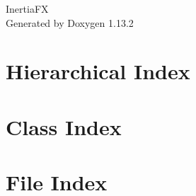 \documentclass[twoside]{book}
\newcommand{\+}{\discretionary{\mbox{\scriptsize$\hookleftarrow$}}{}{}}
\newcommand{\clearemptydoublepage}{%
    \newpage{\pagestyle{empty}\cleardoublepage}%
  }
\begin{document}
  \raggedbottom
    \hypersetup{pageanchor=false,
                bookmarksnumbered=true,
                pdfencoding=unicode
               }
  \begin{titlepage}
  \vspace*{7cm}
  \begin{center}%
  {\Large Inertia\+FX}\\
  \vspace*{1cm}
  {\large Generated by Doxygen 1.13.2}\\
  \end{center}
  \end{titlepage}
  \clearemptydoublepage
  \tableofcontents
  \clearemptydoublepage
  \hypersetup{pageanchor=true}
\chapter{Hierarchical Index}

\chapter{Class Index}

\chapter{File Index}

\end{document}
